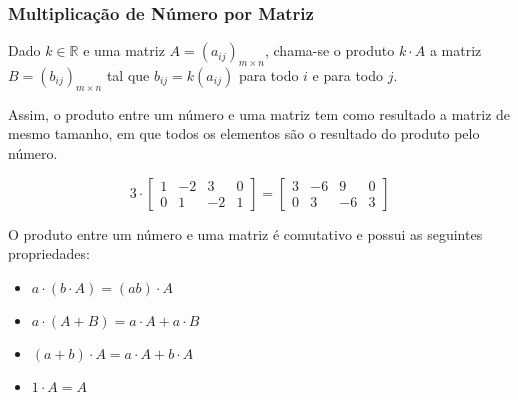\subsubsection{Multiplicação de Número por Matriz}
\begin{df}
Dado $k\in \mathbb{R}$ e uma matriz $A=(a_{ij})_{m \times n}$, chama-se o produto $k\cdot A$ a matriz $B=(b_{ij})_{m\times n}$ tal que $b_{ij}=k(a_{ij})$ para todo $i$ e para todo $j$.
\end{df}
Assim, o produto entre um número e uma matriz tem como resultado a matriz de mesmo tamanho, em que todos os elementos são o resultado do produto pelo número.\par 
\begin{exemplo}
\[3\cdot\begin{bmatrix}
1 & -2 & 3 & 0 \\
0 & 1 & -2 & 1
\end{bmatrix}=\begin{bmatrix}
3 & -6 & 9 & 0 \\
0 & 3 & -6 & 3
\end{bmatrix}\]
\end{exemplo}
O produto entre um número e uma matriz é comutativo e possui as seguintes propriedades:
\begin{itemize}
\item $a\cdot (b\cdot A)=(ab)\cdot A$
\item $a\cdot (A+B) = a\cdot A+a\cdot B$
\item $(a+b)\cdot A=a\cdot A+b\cdot A$
\item $1\cdot A=A$
\end{itemize}
